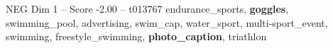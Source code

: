 \begin{textsample}{NEG Dim 1 – Score -2.00 – t013767}  \label{ex:f1_neg_023}
endurance\_sports, \textbf{goggles}, swimming\_pool, advertising, swim\_cap, water\_sport, multi-sport\_event, swimming, freestyle\_swimming, \textbf{photo\_caption}, triathlon

\end{textsample}
